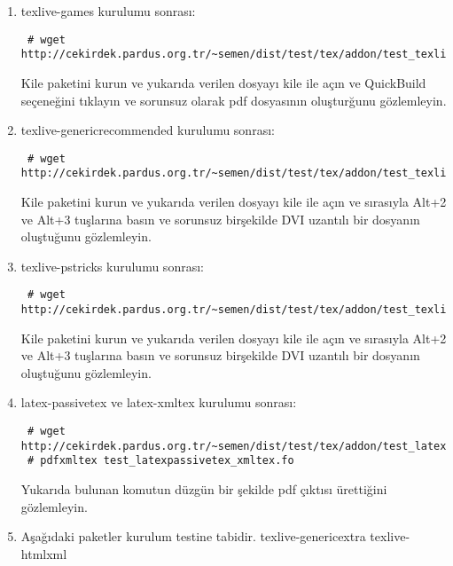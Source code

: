 \documentclass[a4paper,10pt]{article}
\begin{document}
\begin{enumerate}
\item texlive-games kurulumu sonrası:
\begin{verbatim}
 # wget http://cekirdek.pardus.org.tr/~semen/dist/test/tex/addon/test_texlivegames.tex
\end{verbatim}

Kile paketini kurun ve yukarıda verilen dosyayı kile ile açın ve QuickBuild  seçeneğini tıklayın ve sorunsuz olarak pdf dosyasının oluşturğunu gözlemleyin.

\item texlive-genericrecommended kurulumu sonrası:
\begin{verbatim}
 # wget http://cekirdek.pardus.org.tr/~semen/dist/test/tex/addon/test_texlivegenericrecommended.tex
\end{verbatim}

Kile paketini kurun ve yukarıda verilen dosyayı kile ile açın ve sırasıyla Alt+2 ve Alt+3 tuşlarına basın ve sorunsuz birşekilde DVI uzantılı bir dosyanın oluştuğunu gözlemleyin.

\item texlive-pstricks kurulumu sonrası:
\begin{verbatim}
 # wget http://cekirdek.pardus.org.tr/~semen/dist/test/tex/addon/test_texlivepstricks.tex
\end{verbatim}

Kile paketini kurun ve yukarıda verilen dosyayı kile ile açın ve sırasıyla Alt+2 ve Alt+3 tuşlarına basın ve sorunsuz birşekilde DVI uzantılı bir dosyanın oluştuğunu gözlemleyin.
\item  latex-passivetex ve latex-xmltex kurulumu sonrası:
\begin{verbatim}
 # wget http://cekirdek.pardus.org.tr/~semen/dist/test/tex/addon/test_latexpassivetex_xmltex.fo
 # pdfxmltex test_latexpassivetex_xmltex.fo
\end{verbatim}

Yukarıda bulunan komutun düzgün bir şekilde pdf çıktısı ürettiğini gözlemleyin.


\item Aşağıdaki paketler kurulum testine tabidir.
texlive-genericextra
texlive-htmlxml
\end{enumerate}
\end{document}
